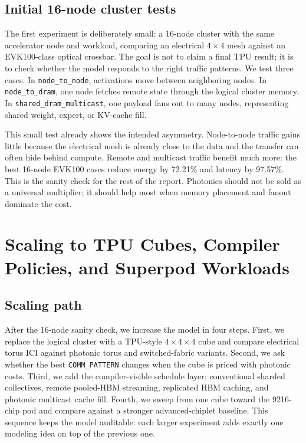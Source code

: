 \documentclass[conference]{IEEEtran}
\begin{document}
\subsection{Initial 16-node cluster tests}
\label{sec:initial}
The first experiment is deliberately small: a 16-node cluster with
the same accelerator node and workload, comparing an electrical
$4{\times}4$ mesh against an EVK100-class optical crossbar. The goal
is not to claim a final TPU result; it is to check whether the model
responds to the right traffic patterns. We test three cases. In
\texttt{node\_to\_node}, activations move between neighboring nodes.
In \texttt{node\_to\_dram}, one node fetches remote state through the
logical cluster memory. In \texttt{shared\_dram\_multicast}, one
payload fans out to many nodes, representing shared weight, expert,
or KV-cache fill.

This small test already shows the intended asymmetry. Node-to-node
traffic gains little because the electrical mesh is already close to
the data and the transfer can often hide behind compute. Remote and
multicast traffic benefit much more: the best 16-node EVK100 cases
reduce energy by 72.21\% and latency by 97.57\%. This is the sanity
check for the rest of the report. Photonics should not be sold as a
universal multiplier; it should help most when memory placement and
fanout dominate the cost.

\section{Scaling to TPU Cubes, Compiler Policies, and Superpod Workloads}
\label{sec:scaling}

\subsection{Scaling path}
\label{sec:scaling-path}
After the 16-node sanity check, we increase the model in four steps.
First, we replace the logical cluster with a TPU-style
$4{\times}4{\times}4$ cube and compare electrical torus ICI against
photonic torus and switched-fabric variants. Second, we ask whether
the best \texttt{COMM\_PATTERN} changes when the cube is priced with
photonic costs. Third, we add the compiler-visible schedule layer:
conventional sharded collectives, remote pooled-HBM streaming,
replicated HBM caching, and photonic multicast cache fill. Fourth,
we sweep from one cube toward the 9216-chip pod and compare against
a stronger advanced-chiplet baseline. This sequence keeps the
model auditable: each larger experiment adds exactly one modeling
idea on top of the previous one.
\end{document}
